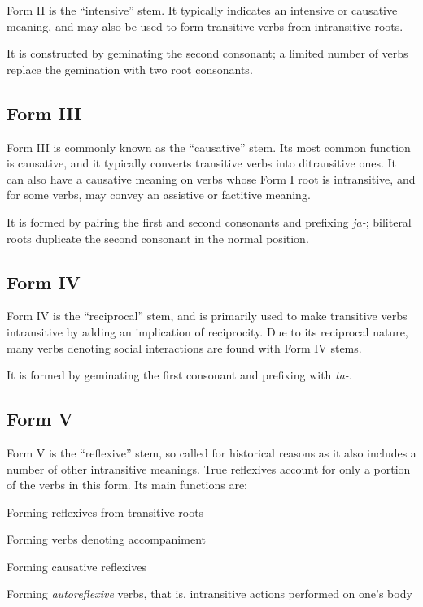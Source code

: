 \documentclass[grammar]{subfiles}
\begin{document}
	Form II is the “intensive” stem. It typically indicates an intensive or causative meaning, and may also be used to form transitive verbs from intransitive roots.

	It is constructed by geminating the second consonant; a limited number of verbs replace the gemination with two root consonants.

	\subsection{Form III}
	\label{ssec:dev_verb_form_iii}

	Form III is commonly known as the “causative” stem. Its most common function is causative, and it typically converts transitive verbs into ditransitive ones. It can also have a causative meaning on verbs whose Form I root is intransitive, and for some verbs, may convey an assistive or factitive meaning.

	It is formed by pairing the first and second consonants and prefixing \textit{ja-}; biliteral roots duplicate the second consonant in the normal position.

	\subsection{Form IV}
	\label{ssec:dev_verb_form_iv}

	Form IV is the “reciprocal” stem, and is primarily used to make transitive verbs intransitive by adding an implication of reciprocity. Due to its reciprocal nature, many verbs denoting social interactions are found with Form IV stems. 
	
	It is formed by geminating the first consonant and prefixing with \textit{ta-}.
	

	\subsection{Form V}
	\label{ssec:dev_verb_form_v}

	Form V is the “reflexive” stem, so called for historical reasons as it also includes a number of other intransitive meanings. True reflexives account for only a portion of the verbs in this form. Its main functions are: 

	\begin{itemize*}
		\item Forming reflexives from transitive roots
		\item Forming verbs denoting accompaniment
		\item Forming causative reflexives
		\item Forming \textit{autoreflexive} verbs, that is, intransitive actions performed on one’s body
	\end{itemize*}
	
\end{document}
